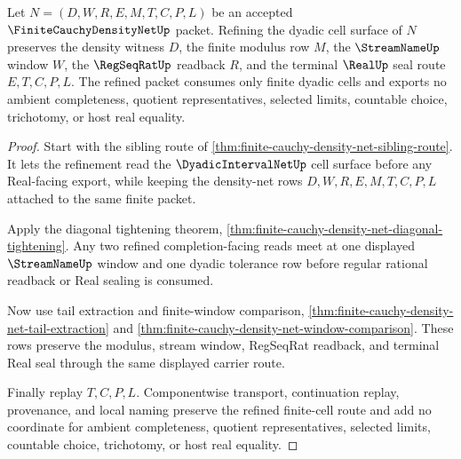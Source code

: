 \begin{theorem}\label{thm:finite-cauchy-density-net-refinement}
Let $N=(D,W,R,E,M,T,C,P,L)$ be an accepted $\FiniteCauchyDensityNetUp$ packet. Refining the dyadic cell surface of $N$ preserves the density witness $D$, the finite modulus row $M$, the $\StreamNameUp$ window $W$, the $\RegSeqRatUp$ readback $R$, and the terminal $\RealUp$ seal route $E,T,C,P,L$. The refined packet consumes only finite dyadic cells and exports no ambient completeness, quotient representatives, selected limits, countable choice, trichotomy, or host real equality.
\end{theorem}
\begin{proof}
Start with the sibling route of \autoref{thm:finite-cauchy-density-net-sibling-route}. It lets the refinement read the $\DyadicIntervalNetUp$ cell surface before any Real-facing export, while keeping the density-net rows $D,W,R,E,M,T,C,P,L$ attached to the same finite packet.

Apply the diagonal tightening theorem, \autoref{thm:finite-cauchy-density-net-diagonal-tightening}. Any two refined completion-facing reads meet at one displayed $\StreamNameUp$ window and one dyadic tolerance row before regular rational readback or Real sealing is consumed.

Now use tail extraction and finite-window comparison, \autoref{thm:finite-cauchy-density-net-tail-extraction} and \autoref{thm:finite-cauchy-density-net-window-comparison}. These rows preserve the modulus, stream window, RegSeqRat readback, and terminal Real seal through the same displayed carrier route.

Finally replay $T,C,P,L$. Componentwise transport, continuation replay, provenance, and local naming preserve the refined finite-cell route and add no coordinate for ambient completeness, quotient representatives, selected limits, countable choice, trichotomy, or host real equality.
\end{proof}

